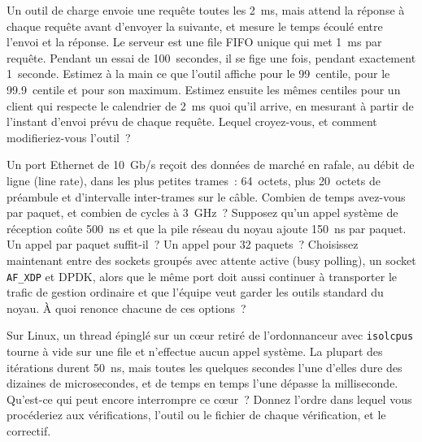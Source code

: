 \begin{question}\label{iq:iv3:low-latency:26}
Un outil de charge envoie une requête toutes les 2~ms, mais attend la réponse à chaque requête avant d'envoyer la suivante, et mesure le temps écoulé entre l'envoi et la réponse. Le serveur est une file FIFO unique qui met 1~ms par requête. Pendant un essai de 100~secondes, il se fige une fois, pendant exactement 1~seconde. Estimez à la main ce que l'outil affiche pour le 99~centile, pour le 99.9~centile et pour son maximum. Estimez ensuite les mêmes centiles pour un client qui respecte le calendrier de 2~ms quoi qu'il arrive, en mesurant à partir de l'instant d'envoi prévu de chaque requête. Lequel croyez-vous, et comment modifieriez-vous l'outil~?
\end{question}

\begin{question}\label{iq:iv3:low-latency:27}
Un port Ethernet de 10~Gb/s reçoit des données de marché en rafale, au débit de ligne (line rate), dans les plus petites trames~: 64~octets, plus 20~octets de préambule et d'intervalle inter-trames sur le câble. Combien de temps avez-vous par paquet, et combien de cycles à 3~GHz~? Supposez qu'un appel système de réception coûte 500~ns et que la pile réseau du noyau ajoute 150~ns par paquet. Un appel par paquet suffit-il~? Un appel pour 32 paquets~? Choisissez maintenant entre des sockets groupés avec attente active (busy polling), un socket \texttt{AF\_XDP} et DPDK, alors que le même port doit aussi continuer à transporter le trafic de gestion ordinaire et que l'équipe veut garder les outils standard du noyau. À quoi renonce chacune de ces options~?
\end{question}

\begin{question}\label{iq:iv3:low-latency:28}
Sur Linux, un thread épinglé sur un cœur retiré de l'ordonnanceur avec \texttt{isolcpus} tourne à vide sur une file et n'effectue aucun appel système. La plupart des itérations durent 50~ns, mais toutes les quelques secondes l'une d'elles dure des dizaines de microsecondes, et de temps en temps l'une dépasse la milliseconde. Qu'est-ce qui peut encore interrompre ce cœur~? Donnez l'ordre dans lequel vous procéderiez aux vérifications, l'outil ou le fichier de chaque vérification, et le correctif.
\end{question}

